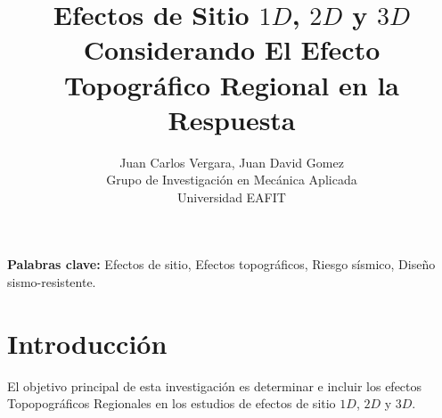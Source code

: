 \documentclass[spanish,letterpaper,12pt,twoside,openany]{article}
\title{\Large{Efectos de Sitio $1D$, $2D$ y $3D$ Considerando El Efecto Topográfico Regional en la Respuesta}}
\author{Juan Carlos Vergara, Juan David Gomez\\
Grupo de Investigación en Mecánica Aplicada\\
 Universidad EAFIT}
\begin{document}
%
%
%
%
%
\renewcommand{\tablename}{Tabla}
\renewcommand{\figurename}{Figura}
\renewcommand{\contentsname}{Tabla de contenido}
\renewcommand{\listtablename}{Lista de tablas}
\renewcommand{\listfigurename}{Lista de figuras}
\newcommand{\ask}{\textquestiondown}

\maketitle

{\bf Palabras clave:} Efectos de sitio, Efectos topográficos, Riesgo sísmico, Diseño sismo-resistente.
\newpage
{}
\tableofcontents
\listoffigures
%
%
\newpage
%
\section{Introducción}
%
El objetivo principal de esta investigación es determinar e incluir los efectos Topopográficos Regionales en los estudios de efectos de sitio $1D$, $2D$ y $3D$.
\end{document}
